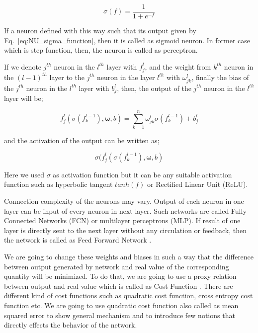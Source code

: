 \documentclass[a4paper,times,12pt]{article}
\begin{document}
\begin{equation}
\label{eq:NU_sigma_function}
\sigma(f) = \frac{1}{1 + e^{-f}}
\end{equation}

If a neuron defined with this way such that its output given by Eq.~\ref{eq:NU_sigma_function}, then it is called as sigmoid neuron. In former case which is step function, then, the neuron is called as perceptron. 

If we denote $j^{th}$ neuron in the $l^{th}$ layer with $f_j^l$, and the weight from $k^{th}$ neuron in the $(l-1)^{th}$ layer to the $j^{th}$ neuron in the layer $l^{th}$ with $\omega_{jk}^l$, finally the bias of the $j^{th}$ neuron in the $l^{th}$ layer with ${b_j^l}$, then, the output of the $j^{th}$ neuron in the $l^{th}$ layer will be;

\begin{equation}
\label{eq:NU_neuron_connection}
f_j^{l}(\sigma(f_k^{l-1}), \boldsymbol{\omega}, b) = \sum\limits_{k=1}^{n} \omega_{jk}^{l}\sigma(f_k^{l-1}) + b_j^l
\end{equation}

\noindent and the activation of the output can be written as;

\begin{equation}
\sigma(f_j^{l}(\sigma(f_k^{l-1}), \boldsymbol{\omega}, b)
\end{equation}


\noindent Here we used $\sigma$ as activation function but it can be any suitable activation function such as hyperbolic tangent $tanh(f)$ or Rectified Linear Unit (ReLU).

Connection complexity of the neurons may vary. Output of each neuron in one layer can be input of every neuron in next layer. Such networks are called Fully Connected Networks (FCN) or multilayer perceptrons (MLP)\cite{nielsen2015neural}. If result of one layer is directly sent to the next layer without any circulation or feedback, then the network is called as Feed Forward Network \cite{nielsen2015neural}.

We are going to change these weights and biases in such a way that the difference between output generated by network and real value of the corresponding quantity will be minimized. To do that, we are going to use a proxy relation between output and real value which is called as Cost Function \cite{nielsen2015neural}. There are different kind of cost functions such as quadratic cost function, cross entropy cost function etc. We are going to use quadratic cost function also called as mean squared error to show general mechanism and to introduce few notions that directly effects the behavior of the network. 
\end{document}
